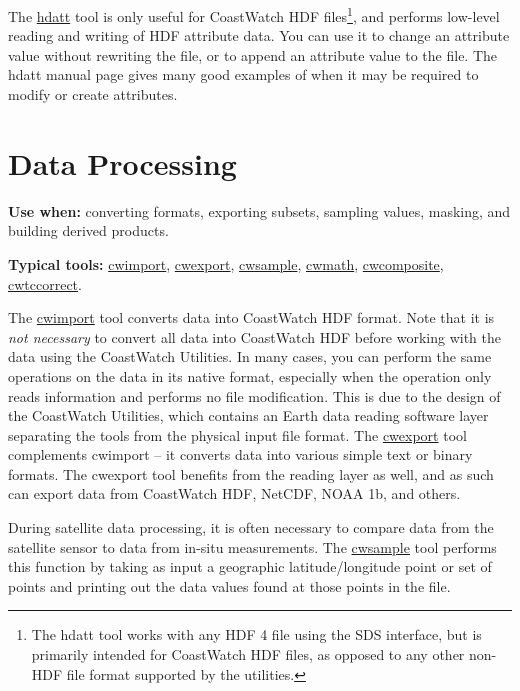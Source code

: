 The \hyperlink{hdatt}{hdatt} tool is only useful for CoastWatch HDF
files\footnote{The hdatt tool works with any HDF 4 file using the
SDS interface, but is primarily intended for CoastWatch HDF files,
as opposed to any other non-HDF file format
supported by the utilities.}, and performs low-level reading and
writing of HDF attribute data.  You can use it to change an attribute
value without rewriting the file, or to append an attribute value
to the file.  The hdatt manual page gives many good examples of
when it may be required to modify or create attributes.

\section{Data Processing}
\label{processing}

\noindent\textbf{Use when:} converting formats, exporting subsets, sampling values, masking, and building derived products.\par
\noindent\textbf{Typical tools:} \hyperlink{cwimport}{cwimport}, \hyperlink{cwexport}{cwexport}, \hyperlink{cwsample}{cwsample}, \hyperlink{cwmath}{cwmath}, \hyperlink{cwcomposite}{cwcomposite}, \hyperlink{cwtccorrect}{cwtccorrect}.\par

The \hyperlink{cwimport}{cwimport} tool converts data into CoastWatch
HDF format.  Note that it is {\em not necessary} to convert all
data into CoastWatch HDF before working with the data using the
CoastWatch Utilities.  In many cases, you can perform the same
operations on the data in its native format, especially when the
operation only reads information and performs no file modification.
This is due to the design of the CoastWatch Utilities, which contains
an Earth data reading software layer separating the tools from the physical input file format.
The \hyperlink{cwexport}{cwexport} tool complements cwimport -- it
converts data into various simple text or binary formats.  The
cwexport tool benefits from the reading layer as well, and as such can
export data from CoastWatch HDF, NetCDF, NOAA 1b, and
others.

During satellite data processing, it is often necessary to compare data
from the satellite sensor to data from in-situ measurements.  The
\hyperlink{cwsample}{cwsample} tool performs this function by taking
as input a geographic latitude/longitude point or set of points and
printing out the data values found at those points in the file.

